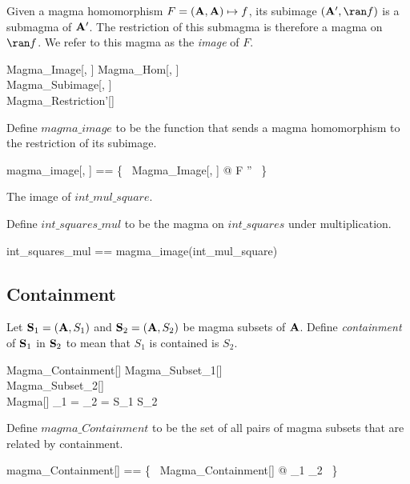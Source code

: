 \documentclass{amsart}
\begin{document}
Given a magma homomorphism $F = (\mathbf{A}, \mathbf{A}) \mapsto f$, its subimage $(\strucA', \ran f)$
is a submagma of $\mathbf{A}'$. 
The restriction of this submagma is therefore a magma on $\ran f$.
We refer to this magma as the \textit{image} of $F$.

\begin{schema}{Magma\_Image}[\genT, \genU]
	Magma\_Hom[\genT, \genU] \\
	Magma\_Subimage[\genT, \genU] \\
	Magma\_Restriction'[\genU]
\end{schema}

Define $magma\_image$ to be the function that sends a magma homomorphism to the
restriction of its subimage.

\begin{zed}
	magma\_image[\genT, \genU] == \{~ Magma\_Image[\genT, \genU] @ F \mapsto \strucA'' ~\}
\end{zed}

\begin{example}
The image of $int\_mul\_square$.

Define $int\_squares\_mul$ to be the magma on $int\_squares$ under multiplication.

\begin{zed}
	int\_squares\_mul == magma\_image(int\_mul\_square)
\end{zed}

\end{example}

\subsection{Containment}

Let $\mathbf{S}_1 = (\mathbf{A}, S_1)$ and $\mathbf{S}_2 = (\mathbf{A}, S_2)$ be magma subsets of $\mathbf{A}$.
Define \textit{containment} of $\mathbf{S}_1$ in $\mathbf{S}_2$ to mean that $S_1$ is contained is $S_2$.

\begin{schema}{Magma\_Containment}[\genT]
	Magma\_Subset_1[\genT] \\
	Magma\_Subset_2[\genT] \\
	Magma[\genT]
\where
	\strucA_1 = \strucA_2 = \strucA
\also
	S_1 \subseteq S_2
\end{schema}

Define $magma\_Containment$ to be the set of all pairs of magma subsets that are
related by containment.

\begin{zed}
	magma\_Containment[\genT] == \{~ Magma\_Containment[\genT] @ \strucS_1 \mapsto \strucS_2 ~\}
\end{zed}
\end{document}
